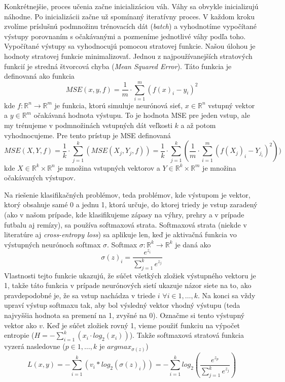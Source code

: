 Konkrétnejšie, proces učenia začne inicializáciou váh. Váhy sa obvykle inicializujú náhodne.
Po inicializácii začne už spomínaný iteratívny proces.
V každom kroku zvolíme príslušnú podmnožinu trénovacích dát (\textit{batch}) a vyhodnotíme vypočítané výstupy porovnaním s očakávanými a pozmeníme jednotlivé váhy podľa toho.
Vypočítané výstupy sa vyhodnocujú pomocou stratovej funkcie.
Našou úlohou je hodnoty stratovej funkcie minimalizovať.
Jednou z najpoužívanejších stratových funkcií je stredná štvorcová chyba (\textit{Mean Squared Error}). Táto funkcia je definovaná ako funkcia $$MSE(x,y,f) = \frac{1}{m} \cdot \sum_{i=1}^m (f(x)_i - y_i)^2$$
kde
$f: \mathbb{R}^n \to \mathbb{R}^m$ je funkcia, ktorú simuluje neurónová sieť, $x \in \mathbb{R}^n$ vstupný vektor a $y \in \mathbb{R}^m$ očakávaná hodnota výstupu.
To je hodnota MSE pre jeden vstup, ale my trénujeme v podmnožinách vstupných dát veľkosti $k$ a až potom vyhodnocujeme. 
Pre tento prístup je MSE definovaná $$MSE(X,Y,f) = \frac{1}{k} \cdot \sum_{j=1}^k (MSE(X_j,Y_j,f)) = \frac{1}{k} \cdot \sum_{j=1}^k (\frac{1}{m} \cdot \sum_{i=1}^m  (f(X_j)_i - Y_{j_i})^2)) $$
kde $X \in \mathbb{R}^k \times \mathbb{R}^n$ je množina vstupných vektorov a $Y \in \mathbb{R}^k \times \mathbb{R}^m$ je množina očakávaných výstupov.

Na riešenie klasifikačných problémov, teda problémov, kde výstupom je vektor, ktorý obsahuje samé 0 a jednu 1, ktorá určuje, do ktorej triedy je vstup zaradený (ako v našom prípade, kde klasifikujeme zápasy na výhry, prehry a v prípade futbalu aj remízy), sa používa softmaxová strata.
Softmaxová strata (niekde v literatúre aj \textit{cross-entropy loss}) sa aplikuje len, keď je aktivačná funkcia vo výstupných neurónoch softmax $\sigma$. 
Softmax $\sigma: \mathbb{R}^k \to \mathbb{R}^k$ je daná ako $$\sigma(z)_i = \frac{e^{z_i}}{\sum_{j=1}^k e^{z_j}}$$
Vlastnosti tejto funkcie ukazujú, že súčet všetkých zložiek výstupného vektoru je 1, takže táto funkcia v prípade neurónových sietí ukazuje názor siete na to, ako pravdepodobné je, že sa vstup nachádza v triede $i$ $\forall i \in {1,\dots , k}$.
Na konci sa vždy upraví výstup softmaxu tak, aby bol výsledný vektor vhodný výstupu (teda najvyššia hodnota sa premení na 1, zvyšné na 0). Označme si tento výstupný vektor ako $v$.
Keď je súčet zložiek rovný 1, vieme použiť funkciu na výpočet entropie ($ H = -\sum_{i=1}^k \left(x_i \cdot log_2(x_i)\right) $).
Takže softmaxová stratová funkcia vyzerá nasledovne ($p \in {1,\dots, k}$ je $argmax_{\sigma(z)}$)
$$L(x,y) = -\sum_{i=1}^k \left(v_i*log_2(\sigma(z)_i)\right) = -\sum_{i=1}^k log_2\left(\frac{e^{z_p}}{\sum_{j=1}^k e^{z_{j}}}\right)  $$

